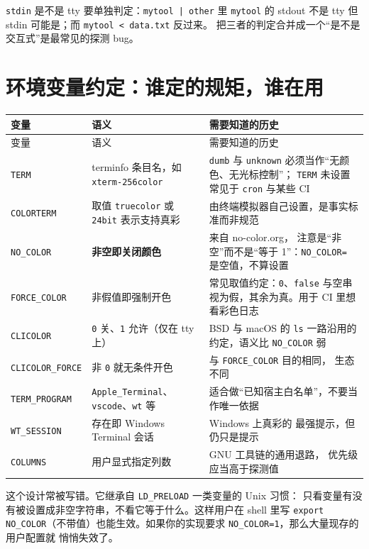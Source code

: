 \documentclass[12pt,a4paper,fontset=fandol]{ctexbook}
\newcommand{\Tp}[1]{\texttt{#1}}
\begin{document}
\Tp{stdin} 是不是 tty 要单独判定：\Tp{mytool | other} 里 \Tp{mytool} 的
stdout 不是 tty 但 stdin 可能是；而 \Tp{mytool < data.txt} 反过来。
把三者的判定合并成一个``是不是交互式''是最常见的探测 bug。

\section{环境变量约定：谁定的规矩，谁在用}

\begin{longtable}{@{}>{\raggedright\arraybackslash}p{}
                 >{\raggedright\arraybackslash}p{}
                 >{\raggedright\arraybackslash}p{}@{}}
\toprule
变量 & 语义 & 需要知道的历史 \\
\midrule
\endfirsthead
\toprule
变量 & 语义 & 需要知道的历史 \\
\midrule
\endhead
\Tp{TERM} & terminfo 条目名，如 \Tp{xterm-256color} &
\Tp{dumb} 与 \Tp{unknown} 必须当作``无颜色、无光标控制''；
\Tp{TERM} 未设置常见于 \Tp{cron} 与某些 CI \\
\Tp{COLORTERM} & 取值 \Tp{truecolor} 或 \Tp{24bit} 表示支持真彩 &
由终端模拟器自己设置，是事实标准而非规范 \\
\Tp{NO\_COLOR} & \textbf{非空即关闭颜色} & 来自 no-color.org，
注意是``非空''而不是``等于 1''：\Tp{NO\_COLOR=} 是空值，不算设置 \\
\Tp{FORCE\_COLOR} & 非假值即强制开色 & 常见取值约定：\Tp{0}、\Tp{false}
与空串视为假，其余为真。用于 CI 里想看彩色日志 \\
\Tp{CLICOLOR} & \Tp{0} 关、\Tp{1} 允许（仅在 tty 上） &
BSD 与 macOS 的 \Tp{ls} 一路沿用的约定，语义比 \Tp{NO\_COLOR} 弱 \\
\Tp{CLICOLOR\_FORCE} & 非 \Tp{0} 就无条件开色 & 与 \Tp{FORCE\_COLOR} 目的相同，
生态不同 \\
\Tp{TERM\_PROGRAM} & \Tp{Apple\_Terminal}、\Tp{vscode}、\Tp{wt} 等 &
适合做``已知宿主白名单''，不要当作唯一依据 \\
\Tp{WT\_SESSION} & 存在即 Windows Terminal 会话 & Windows 上真彩的
最强提示，但仍只是提示 \\
\Tp{COLUMNS} & 用户显式指定列数 & GNU 工具链的通用退路，
优先级应当高于探测值 \\
\bottomrule
\end{longtable}

\begin{note}[title={为什么 NO\_COLOR 是``非空即生效''}]
这个设计常被写错。它继承自 \Tp{LD\_PRELOAD} 一类变量的 Unix 习惯：
只看变量有没有被设置成非空字符串，不看它等于什么。这样用户在
shell 里写 \Tp{export NO\_COLOR}（不带值）也能生效。如果你的实现要求
\Tp{NO\_COLOR=1}，那么大量现存的用户配置就 悄悄失效了。
\end{note}
\end{document}

